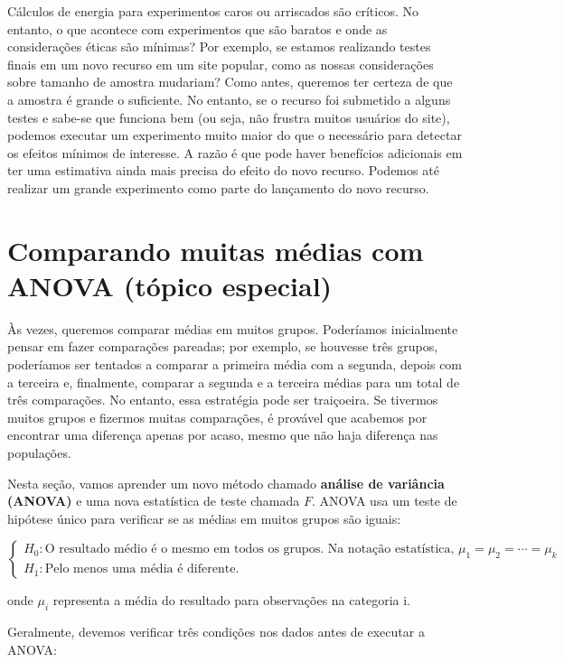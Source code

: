 \documentclass[
]{book}
\theoremstyle{definition}
\theoremstyle{definition}
\theoremstyle{definition}
\theoremstyle{definition}
\theoremstyle{remark}
\begin{document}
Cálculos de energia para experimentos caros ou arriscados são críticos. No entanto, o que acontece com experimentos que são baratos e onde as considerações éticas são mínimas? Por exemplo, se estamos realizando testes finais em um novo recurso em um site popular, como as nossas considerações sobre tamanho de amostra mudariam? Como antes, queremos ter certeza de que a amostra é grande o suficiente. No entanto, se o recurso foi submetido a alguns testes e sabe-se que funciona bem (ou seja, não frustra muitos usuários do site), podemos executar um experimento muito maior do que o necessário para detectar os efeitos mínimos de interesse. A razão é que pode haver benefícios adicionais em ter uma estimativa ainda mais precisa do efeito do novo recurso. Podemos até realizar um grande experimento como parte do lançamento do novo recurso.

\hypertarget{comparingAveragesANOVA}{%
\section{Comparando muitas médias com ANOVA (tópico especial)}\label{comparingAveragesANOVA}}

Às vezes, queremos comparar médias em muitos grupos. Poderíamos inicialmente pensar em fazer comparações pareadas; por exemplo, se houvesse três grupos, poderíamos ser tentados a comparar a primeira média com a segunda, depois com a terceira e, finalmente, comparar a segunda e a terceira médias para um total de três comparações. No entanto, essa estratégia pode ser traiçoeira. Se tivermos muitos grupos e fizermos muitas comparações, é provável que acabemos por encontrar uma diferença apenas por acaso, mesmo que não haja diferença nas populações.

Nesta seção, vamos aprender um novo método chamado \textbf{análise de variância (ANOVA)} e uma nova estatística de teste chamada \(F\). ANOVA usa um teste de hipótese único para verificar se as médias em muitos grupos são iguais:

\[
\begin{cases}
  H_0: \mbox{O resultado médio é o mesmo em todos os grupos. Na notação estatística, }\mu_1 = \mu_2 = \cdots = \mu_k \\
  H_1: \mbox{Pelo menos uma média é diferente.}
\end{cases}
\]

onde \(\mu_i\) representa a média do resultado para observações na categoria i.

Geralmente, devemos verificar três condições nos dados antes de executar a ANOVA:
\end{document}
